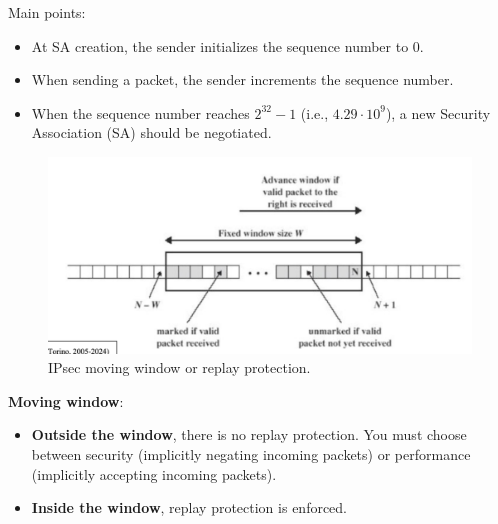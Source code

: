 \begin{multicols}{2}
\raggedcolumns
    Main points:
    \begin{itemize}
        \item At SA creation, the sender initializes the sequence number to 0.
        \item When sending a packet, the sender increments the sequence number.
        \item When the sequence number reaches \( 2^{32} - 1 \) (i.e., \( 4.29 \cdot 10^{9}\)), a new Security Association (SA) should be negotiated.
    \end{itemize}
\columnbreak

    
\begin{figure}[H]
    \centering
  \includegraphics[width=\linewidth]{Images/NetSec/ipsec_replay_protection.png}
  \caption{IPsec moving window or replay protection.}
\end{figure}
\end{multicols}

\textbf{Moving window}:
        \begin{itemize}
            \item \textbf{Outside the window}, there is no replay protection. You must choose between security (implicitly negating incoming packets) or performance (implicitly accepting incoming packets).
            \item \textbf{Inside the window}, replay protection is enforced.
        \end{itemize}


